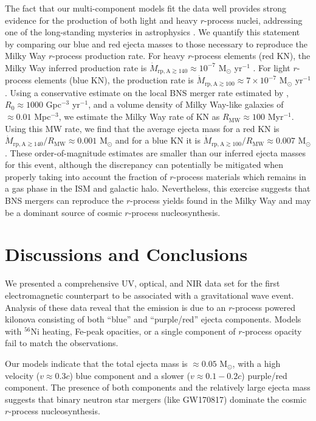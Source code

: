 The fact that our multi-component models fit the data well provides strong evidence for the production of both light and heavy $r$-process nuclei, addressing one of the long-standing mysteries in astrophysics \citep{Burbidge1957,Cameron1957}. We quantify this statement by comparing our blue and red ejecta masses to those necessary to reproduce the Milky Way $r$-process production rate.  For heavy $r$-process elements (red KN), the Milky Way inferred production rate is $\dot{M}_\mathrm{rp,A\gtrsim 140}\approx 10^{-7}$ M$_\odot$ yr$^{-1}$ \citep{Bauswein+14}. For light $r$-process elements (blue KN), the production rate is $\dot{M}_\mathrm{rp,A\gtrsim 100}\approx 7\times 10^{-7}$ M$_\odot$ yr$^{-1}$ \citep{Qian2000}. Using a conservative estimate on the local BNS merger rate estimated by \citet{LIGOO1Rates}, $R_\mathrm{0}\approx 1000$ Gpc$^{-3}$ yr$^{-1}$, and a volume density of Milky Way-like galaxies of $\approx 0.01$ Mpc$^{-3}$, we estimate the Milky Way rate of KN as $R_\mathrm{MW}\approx 100$ Myr$^{-1}$.  Using this MW rate, we find that the average ejecta mass for a red KN is $\dot{M}_\mathrm{rp,A\gtrsim 140}/R_\mathrm{MW}\approx 0.001$ M$_\odot$ and for a blue KN it is $\dot{M}_\mathrm{rp,A\gtrsim 100}/R_\mathrm{MW}\approx 0.007$ M$_\odot$. These order-of-magnitude estimates are  smaller than our inferred ejecta masses for this event, although the discrepancy can potentially be mitigated when properly taking into account the fraction of $r$-process materials which remains in a gas phase in the ISM and galactic halo. Nevertheless, this exercise suggests that BNS mergers can reproduce the $r$-process yields found in the Milky Way and may be a dominant source of cosmic $r$-process nucleosynthesis.

\section{Discussions and Conclusions}
\label{sec:ch5_conc}

We presented a comprehensive UV, optical, and NIR data set for the first electromagnetic counterpart to be associated with a gravitational wave event.  Analysis of these data reveal that the emission is due to an $r$-process powered kilonova consisting of both ``blue'' and ``purple/red'' ejecta components. Models with $^{56}$Ni heating, Fe-peak opacities, or a single component of $r$-process opacity fail to match the observations.

Our models indicate that the total ejecta mass is $\approx 0.05$ M$_\odot$, with a high velocity ($v\approx 0.3c$) blue component and a slower ($v\approx 0.1-0.2c$) purple/red component.  The presence of both components and the relatively large ejecta mass suggests that binary neutron star mergers (like GW170817) dominate the cosmic $r$-process nucleosynthesis.

